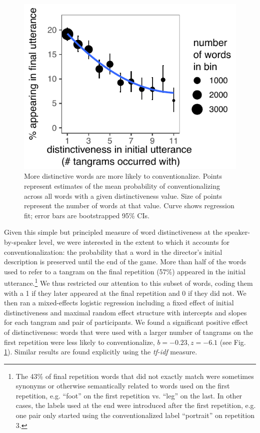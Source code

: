 \documentclass[alpha-refs]{wiley-article}
\begin{document}
\begin{figure}[t!]
\centering
\includegraphics[scale=.85]{distinctiveness.pdf}
\caption{More distinctive words are more likely to conventionalize. Points represent estimates of the mean probability of conventionalizing across all words with a given distinctiveness value. Size of points represent the number of words at that value. Curve shows regression fit; error bars are bootstrapped 95\% CIs.}
\label{fig:distinct}
\end{figure}
%
Given this simple but principled measure of word distinctiveness at the speaker-by-speaker level, we were interested in the extent to which it accounts for conventionalization: the probability that a word in the director's initial description is preserved until the end of the game.
More than half of the words used to refer to a tangram on the final repetition (57\%) appeared in the initial utterance.\footnote{The 43\% of final repetition words that did not exactly match were sometimes synonyms or otherwise semantically related to words used on the first repetition, e.g. ``foot'' on the first repetition vs. ``leg'' on the last. In other cases, the labels used at the end were introduced after the first repetition, e.g. one pair only started using the conventionalized label ``portrait'' on repetition 3.}
We thus restricted our attention to this subset of words, coding them with a 1 if they later appeared at the final repetition and 0 if they did not.
We then ran a mixed-effects logistic regression including a fixed effect of initial distinctiveness and maximal random effect structure with intercepts and slopes for each tangram and pair of participants.
We found a significant positive effect of distinctiveness: words that were used with a larger number of tangrams on the first repetition were less likely to conventionalize, $b = -0.23, z = -6.1$ (see Fig. \ref{fig:distinct}).
Similar results are found explicitly using the \emph{tf-idf} measure.
\end{document}
